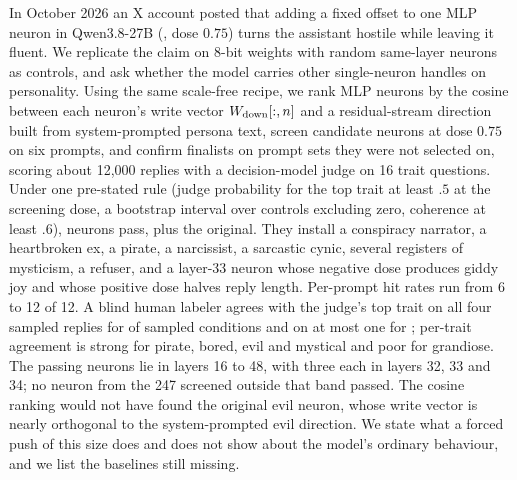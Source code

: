 In October 2026 an X account posted that adding a fixed offset to one MLP neuron in Qwen3.8-27B
(, dose $0.75$) turns the assistant hostile while leaving it fluent. We replicate the claim on
8-bit weights with random same-layer neurons as controls, and ask whether the model carries other
single-neuron handles on personality. Using the same scale-free recipe, we rank MLP neurons by the cosine
between each neuron's write vector $W_{\mathrm{down}}[:,n]$ and a residual-stream direction built from system-prompted
persona text, screen \nScreened{} candidate neurons at dose $0.75$ on six prompts, and confirm \nFinalists{}
finalists on prompt sets they were not selected on, scoring about 12{,}000 replies with a decision-model
judge on 16 trait questions. Under one pre-stated rule (judge probability for the top trait at least $.5$ at
the screening dose, a bootstrap interval over controls excluding zero, coherence at least $.6$), \nFound{}
neurons pass, plus the original. They install a conspiracy narrator, a heartbroken ex, a pirate, a narcissist,
a sarcastic cynic, several registers of mysticism, a refuser, and a layer-33 neuron whose negative dose
produces giddy joy and whose positive dose halves reply length. Per-prompt hit rates run from 6 to 12 of 12.
A blind human labeler agrees with the judge's top trait on all four sampled replies for \humanFour{} of
\humanConds{} sampled conditions and on at most one for \humanOne{}; per-trait agreement is strong for pirate,
bored, evil and mystical and poor for grandiose. The passing neurons lie in layers 16 to 48, with three each
in layers 32, 33 and 34; no neuron from the 247 screened outside that band passed. The cosine ranking would
not have found the original evil neuron, whose write vector is nearly orthogonal to the system-prompted evil
direction. We state what a forced push of this size does and does not show about the model's ordinary
behaviour, and we list the baselines still missing.
